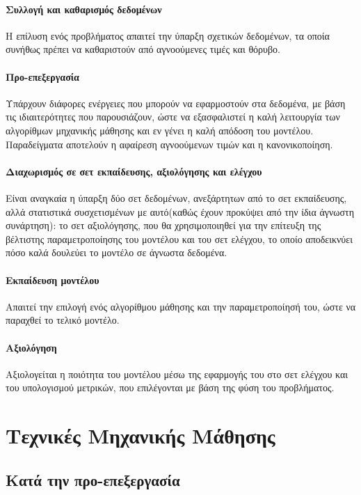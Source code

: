 \begin{minipage}{0.48\linewidth}
	\paragraph{Συλλογή και καθαρισμός δεδομένων} Η επίλυση ενός προβλήματος απαιτεί την ύπαρξη σχετικών δεδομένων, τα οποία συνήθως πρέπει να καθαριστούν από αγνοούμενες τιμές και θόρυβο. 
	\paragraph{Προ-επεξεργασία} Υπάρχουν διάφορες ενέργειες που μπορούν να εφαρμοστούν στα δεδομένα, με βάση τις ιδιαιτερότητες που παρουσιάζουν, ώστε να εξασφαλιστεί η καλή λειτουργία των αλγορίθμων μηχανικής μάθησης και εν γένει η καλή απόδοση του μοντέλου. Παραδείγματα αποτελούν η αφαίρεση αγνοούμενων τιμών και η κανονικοποίηση.
	\paragraph{Διαχωρισμός σε σετ εκπαίδευσης, αξιολόγησης και ελέγχου} Είναι αναγκαία η ύπαρξη δύο σετ δεδομένων, ανεξάρτητων από το σετ εκπαίδευσης, αλλά στατιστικά συσχετισμένων με αυτό(καθώς έχουν προκύψει από την ίδια άγνωστη συνάρτηση): το σετ αξιολόγησης, που θα χρησιμοποιηθεί για την επίτευξη της βέλτιστης παραμετροποίησης του μοντέλου  και του σετ ελέγχου, το οποίο αποδεικνύει πόσο καλά δουλεύει το μοντέλο σε άγνωστα δεδομένα.
    \paragraph{Εκπαίδευση μοντέλου} Απαιτεί την επιλογή ενός αλγορίθμου μάθησης και την παραμετροποίησή του, ώστε να παραχθεί το τελικό μοντέλο.
	\paragraph{Αξιολόγηση} Αξιολογείται η ποιότητα του μοντέλου μέσω της εφαρμογής του στο σετ ελέγχου και του υπολογισμού μετρικών, που επιλέγονται με βάση της φύση του προβλήματος.
\end{minipage}
\section{Τεχνικές Μηχανικής Μάθησης}
\subsection{Κατά την προ-επεξεργασία}
